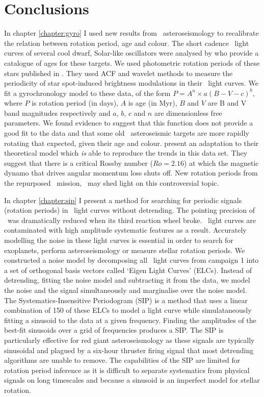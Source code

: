 \chapter{Conclusions}
\label{chapter:conclusions}

In chapter \ref{chapter:gyro} I used new results from \kepler\
asteroseismology to recalibrate the relation between rotation period, age and
colour.
The short cadence \kepler\ light curves of several cool dwarf, Solar-like
oscillators were analysed by \citet{Chaplin2014} who provide a catalogue of
ages for these targets.
We used photometric rotation periods of these stars published in
\citet{Garcia2014}.
They used ACF and wavelet methods to measure the periodicity of star
spot-induced brightness modulations in their \kepler\ light curves.
We fit a gyrochronology model to these data, of the form $P = A^n \times
a(B-V-c)^b$, where $P$ is rotation period (in days), $A$ is age (in Myr), $B$
and $V$ are B and V band magnitudes respectively and $a$, $b$, $c$ and $n$ are
dimensionless free parameters.
We found evidence to suggest that this function does not provide a good fit to
the data and that some old \kepler\ asteroseismic targets are more rapidly
rotating that expected, given their age and colour.
\citet{Vansaders2016} present an adaptation to their theoretical model which
{\it is} able to reproduce the trends in this data set.
They suggest that there is a critical Rossby number ($Ro=2.16$) at which the
magnetic dynamo that drives angular momentum loss shuts off.
New rotation periods from the repurposed \kepler\ mission, \ktwo\ may shed
light on this controversial topic.

In chapter \ref{chapter:sip} I present a method for searching for periodic
signals (\eg rotation periods) in \ktwo\ light curves without detrending.
The pointing precision of \kepler\ was dramatically reduced when its third
reaction wheel broke.
\ktwo\ light curves are contaminated with high amplitude systematic features
as a result.
Accurately modelling the noise in these light curves is essential in order to
search for exoplanets, perform asteroseismology or measure stellar rotation
periods.
We constructed a noise model by decomposing all \ktwo\ light curves from
campaign 1 into a set of orthogonal basis vectors called `Eigen Light Curves'
(ELCs).
Instead of detrending, fitting the noise model and subtracting it from the
data, we model the noise and the signal simultaneously and marginalise over
the noise model.
The Systematics-Insensitive Periodogram (SIP) is a method that uses a linear
combination of 150 of these ELCs to model a light curve while simulataneously
fitting a sinusoid to the data at a given frequency.
Finding the amplitudes of the best-fit sinusoids over a grid of frequencies
produces a SIP.
The SIP is particularly effective for red giant asteroseismology as these
signals are typically sinusoidal and plagued by a six-hour thruster firing
signal that most detrending algorithms are unable to remove.
The capabilities of the SIP are limited for rotation period inference as
it is difficult to separate systematics from physical signals on long
timescales and because a sinusoid is an imperfect model for stellar rotation.

